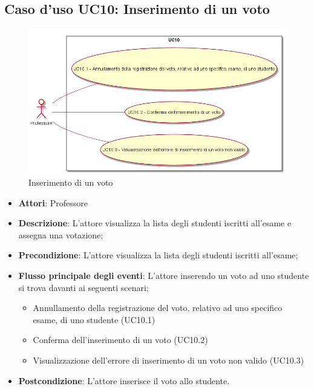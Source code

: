 \subsection{Caso d'uso \texorpdfstring{UC10}{UC10}: Inserimento di un voto }
\begin{figure} [H]
\centering
\includegraphics[scale=0.45]{./img/UC10.png}
\caption{Inserimento di un voto }\label{}
\end{figure}
\begin{itemize}
\item \textbf{Attori}: Professore
\item \textbf{Descrizione}: L'attore visualizza la lista degli studenti iscritti all'esame e assegna una votazione;
\item \textbf{Precondizione}: L'attore visualizza la lista degli studenti iscritti all'esame;
\item \textbf{Flusso principale degli eventi}: L'attore inserendo un voto ad uno studente si trova davanti ai seguenti scenari;
\begin{itemize}
\item Annullamento della registrazione del voto, relativo ad uno specifico esame, di uno studente (UC10.1)
\item Conferma dell'inserimento di un voto (UC10.2)
\item Visualizzazione dell'errore di inserimento di un voto non valido (UC10.3)
\end{itemize}
\item \textbf{Postcondizione}: L'attore inserisce il voto allo studente.
\end{itemize}
